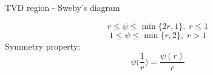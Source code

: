 \documentclass{beamer}
\begin{document}
\begin{frame}{TVD region - Sweby's diagram}
\begin{minipage}[t]{0.63\textwidth}
\begin{figure}
	\centering
	\hspace{-1.24cm}
	
\end{figure}
\end{minipage}
\begin{minipage}[t]{0.35\textwidth}
	\vspace{1cm}
\begin{equation*}
	r \leq \psi \leq \min \{2r, 1\}, \; r\leq1
\end{equation*}
\begin{equation*}
	1 \leq \psi \leq \min \{r, 2\}, \; r>1
\end{equation*}
	Symmetry property:
	\begin{equation*}
	\psi\bigg(\frac{1}{r}\bigg) = \frac{\psi(r)}{r}
	\end{equation*}
\end{minipage}
\end{frame}
\end{document}
